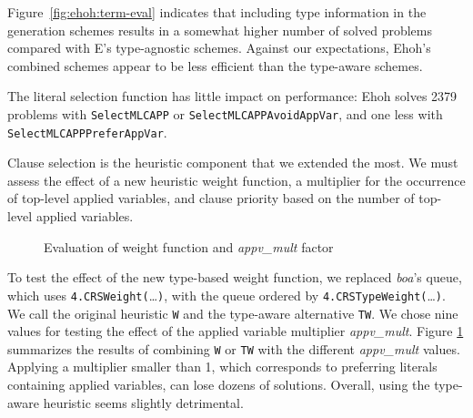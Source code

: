 Figure~\ref{fig:ehoh:term-eval} indicates that including type information in
the generation schemes results in a somewhat higher number of solved problems
compared with E's type-agnostic schemes. Against our expectations, Ehoh's
combined schemes appear to be less efficient than the type-aware schemes.

  The literal selection function has little impact on performance: Ehoh
  solves 2379 problems with \texttt{SelectMLCAPP} or
  \texttt{SelectMLCAPPAvoid}\-\texttt{AppVar}, and one less with
  \texttt{SelectMLCAPPPreferAppVar}.

Clause selection is the heuristic component that we extended the most. We must
assess the effect of a new heuristic weight function, a multiplier for the
occurrence of top-level applied variables, and clause priority based on the
number of top-level applied variables.

\begin{figure}[t]
  \center
  \caption{Evaluation of weight function and \textit{appv\_mult} factor}
  \label{fig:ehoh:clauseweight-fun-eval}
\end{figure}

To test the effect of the new type-based weight function, we replaced
\emph{boa}'s queue, which uses
\texttt{4.CRS\-Weight(}\ldots\texttt{)}, with the queue ordered by
\texttt{4.CRSTypeWeight(}\ldots\texttt{)}. We call the original
heuristic \texttt{W} and the type-aware alternative \texttt{TW}.
%
We chose nine values for testing the effect of the applied
variable multiplier \textit{appv\_mult}.
%
Figure \ref{fig:ehoh:clauseweight-fun-eval} summarizes the results of combining
\texttt{W} or \texttt{TW} with the different
\textit{appv\_\allowbreak mult} values. Applying a multiplier smaller than
1, which corresponds to preferring literals containing applied variables, can
lose dozens of solutions. Overall, using the type-aware heuristic seems
slightly detrimental.


